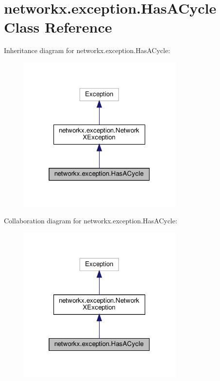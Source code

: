 \hypertarget{classnetworkx_1_1exception_1_1HasACycle}{}\section{networkx.\+exception.\+Has\+A\+Cycle Class Reference}
\label{classnetworkx_1_1exception_1_1HasACycle}


Inheritance diagram for networkx.\+exception.\+Has\+A\+Cycle\+:
\nopagebreak
\begin{figure}[H]
\begin{center}
\leavevmode
\includegraphics[width=235pt]{classnetworkx_1_1exception_1_1HasACycle__inherit__graph}
\end{center}
\end{figure}


Collaboration diagram for networkx.\+exception.\+Has\+A\+Cycle\+:
\nopagebreak
\begin{figure}[H]
\begin{center}
\leavevmode
\includegraphics[width=235pt]{classnetworkx_1_1exception_1_1HasACycle__coll__graph}
\end{center}
\end{figure}


